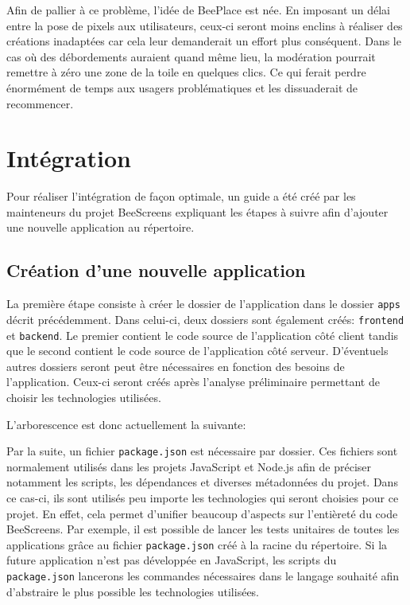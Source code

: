 Afin de pallier à ce problème, l'idée de BeePlace est née. En imposant un délai entre la pose de pixels aux utilisateurs, ceux-ci seront moins enclins à réaliser des créations inadaptées car cela leur demanderait un effort plus conséquent. Dans le cas où des débordements auraient quand même lieu, la modération pourrait remettre à zéro une zone de la toile en quelques clics. Ce qui ferait perdre énormément de temps aux usagers problématiques et les dissuaderait de recommencer.

\section{Intégration}

Pour réaliser l'intégration de façon optimale, un guide \cite{addapptobeescreens} a été créé par les mainteneurs du projet BeeScreens expliquant les étapes à suivre afin d'ajouter une nouvelle application au répertoire.

\subsection{Création d'une nouvelle application}

La première étape consiste à créer le dossier de l'application dans le dossier \texttt{apps} décrit précédemment. Dans celui-ci, deux dossiers sont également créés: \texttt{frontend} et \texttt{backend}. Le premier contient le code source de l'application côté client tandis que le second contient le code source de l'application côté serveur. D'éventuels autres dossiers seront peut être nécessaires en fonction des besoins de l'application. Ceux-ci seront créés après l'analyse préliminaire permettant de choisir les technologies utilisées.

L'arborescence est donc actuellement la suivante:


Par la suite, un fichier \texttt{package.json} est nécessaire par dossier. Ces fichiers sont normalement utilisés dans les projets JavaScript et Node.js afin de préciser notamment les scripts, les dépendances et diverses métadonnées du projet. Dans ce cas-ci, ils sont utilisés peu importe les technologies qui seront choisies pour ce projet. En effet, cela permet d'unifier beaucoup d'aspects sur l'entièreté du code BeeScreens. Par exemple, il est possible de lancer les tests unitaires de toutes les applications grâce au fichier \texttt{package.json} créé à la racine du répertoire. Si la future application n'est pas développée en JavaScript, les scripts du \texttt{package.json} lancerons les commandes nécessaires dans le langage souhaité afin d'abstraire le plus possible les technologies utilisées.

